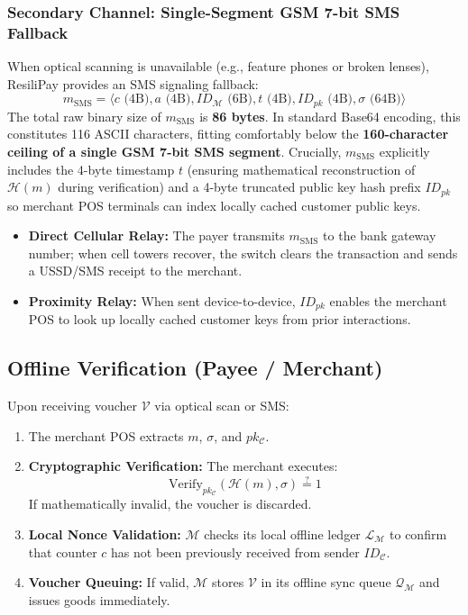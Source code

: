 \documentclass[conference]{IEEEtran}
\begin{document}
\subsubsection{Secondary Channel: Single-Segment GSM 7-bit SMS Fallback}
When optical scanning is unavailable (e.g., feature phones or broken lenses), ResiliPay provides an SMS signaling fallback:
\begin{equation}
m_{\text{SMS}} = \langle c \text{ (4B)}, a \text{ (4B)}, ID_{\mathcal{M}} \text{ (6B)}, t \text{ (4B)}, ID_{pk} \text{ (4B)}, \sigma \text{ (64B)} \rangle
\end{equation}
The total raw binary size of $m_{\text{SMS}}$ is \textbf{86 bytes}. In standard Base64 encoding, this constitutes 116 ASCII characters, fitting comfortably below the \textbf{160-character ceiling of a single GSM 7-bit SMS segment}.
Crucially, $m_{\text{SMS}}$ explicitly includes the 4-byte timestamp $t$ (ensuring mathematical reconstruction of $\mathcal{H}(m)$ during verification) and a 4-byte truncated public key hash prefix $ID_{pk}$ so merchant POS terminals can index locally cached customer public keys.
\begin{itemize}
    \item \textbf{Direct Cellular Relay:} The payer transmits $m_{\text{SMS}}$ to the bank gateway number; when cell towers recover, the switch clears the transaction and sends a USSD/SMS receipt to the merchant.
    \item \textbf{Proximity Relay:} When sent device-to-device, $ID_{pk}$ enables the merchant POS to look up locally cached customer keys from prior interactions.
\end{itemize}

\subsection{Offline Verification (Payee / Merchant)}
Upon receiving voucher $\mathcal{V}$ via optical scan or SMS:
\begin{enumerate}
    \item The merchant POS extracts $m$, $\sigma$, and $pk_{\mathcal{C}}$.
    \item \textbf{Cryptographic Verification:} The merchant executes:
    \begin{equation}
    \text{Verify}_{pk_{\mathcal{C}}}(\mathcal{H}(m), \sigma) \stackrel{?}{=} 1
    \end{equation}
    If mathematically invalid, the voucher is discarded.
    \item \textbf{Local Nonce Validation:} $\mathcal{M}$ checks its local offline ledger $\mathcal{L}_{\mathcal{M}}$ to confirm that counter $c$ has not been previously received from sender $ID_{\mathcal{C}}$.
    \item \textbf{Voucher Queuing:} If valid, $\mathcal{M}$ stores $\mathcal{V}$ in its offline sync queue $\mathcal{Q}_{\mathcal{M}}$ and issues goods immediately.
\end{enumerate}
\end{document}
